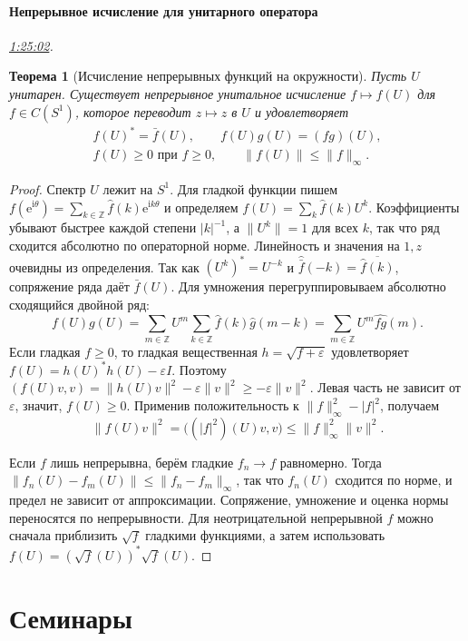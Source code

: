 \documentclass[11pt,a4paper]{article}
\theoremstyle{plain}
\newtheorem{theorem}{Теорема}[section]
\theoremstyle{definition}
\newcommand{\ZZ}{\mathbb Z}
\newcommand{\id}{I}
\newcommand{\ii}{\mathrm i}
\newcommand{\ee}{\mathrm e}
\newcommand{\abs}[1]{\lvert#1\rvert}
\newcommand{\norm}[1]{\lVert#1\rVert}
\newcommand{\at}[3]{\href{https://www.youtube.com/watch?v=#1&t=#2s}{#3}}
\newcommand{\topic}[2]{\Needspace{5\baselineskip}\subsection*{#1}\noindent\emph{#2.}\par\nobreak\smallskip}
\begin{document}
\topic{Непрерывное исчисление для унитарного оператора}{\at{E-jM7sTmSKc}{5102}{1:25:02}}
\begin{theorem}[Исчисление непрерывных функций на окружности]
Пусть $U$ унитарен. Существует непрерывное унитальное
исчисление $f\mapsto f(U)$ для $f\in C(S^1)$,
которое переводит $z\mapsto z$ в $U$ и удовлетворяет
\[
 \begin{gathered}
 f(U)^*=\bar f(U),\qquad f(U)g(U)=(fg)(U),\\
 f(U)\ge0\text{ при }f\ge0,\qquad
 \norm{f(U)}\le\norm f_\infty .
 \end{gathered}
\]
\end{theorem}
\begin{proof}
Спектр $U$ лежит на $S^1$. Для гладкой функции пишем
$f(\ee^{\ii\theta})=\sum_{k\in\ZZ}\widehat f(k)\ee^{\ii k\theta}$
и определяем $f(U)=\sum_k\widehat f(k)U^k$.
Коэффициенты убывают быстрее каждой степени $|k|^{-1}$,
а $\norm{U^k}=1$ для всех $k$, так что ряд сходится
абсолютно по операторной норме. Линейность и значения
на $1,z$ очевидны из определения.
Так как $(U^k)^*=U^{-k}$ и
$\widehat{\bar f}(-k)=\overline{\widehat f(k)}$, сопряжение
ряда даёт $\bar f(U)$. Для умножения перегруппировываем
абсолютно сходящийся двойной ряд:
\[
 f(U)g(U)
 =\sum_{m\in\ZZ} U^m\sum_{k\in\ZZ}\widehat f(k)\widehat g(m-k)
 =\sum_{m\in\ZZ} U^m\widehat{fg}(m).
\]
Если гладкая $f\ge0$, то гладкая вещественная
$h=\sqrt{f+\varepsilon}$ удовлетворяет
$f(U)=h(U)^*h(U)-\varepsilon\id$. Поэтому
$(f(U)v,v)=\norm{h(U)v}^2-\varepsilon\norm v^2\ge
-\varepsilon\norm v^2$. Левая часть не зависит от
$\varepsilon$, значит, $f(U)\ge0$. Применив положительность
к $\norm f_\infty^2-\abs f^2$, получаем
\[
 \norm{f(U)v}^2=\bigl((|f|^2)(U)v,v\bigr)
 \le\norm f_\infty^2\norm v^2.
\]

Если $f$ лишь непрерывна, берём гладкие $f_n\to f$
равномерно. Тогда
$\norm{f_n(U)-f_m(U)}\le\norm{f_n-f_m}_\infty$,
так что $f_n(U)$ сходится по норме, и предел
не зависит от аппроксимации. Сопряжение,
умножение и оценка нормы переносятся по
непрерывности. Для неотрицательной непрерывной
$f$ можно сначала приблизить $\sqrt f$ гладкими
функциями, а затем использовать
$f(U)=(\sqrt f(U))^*\sqrt f(U)$.
\end{proof}

\part{Семинары}
\setcounter{section}{0}
\renewcommand{\thetheorem}{С\arabic{section}.\arabic{theorem}}
\end{document}
